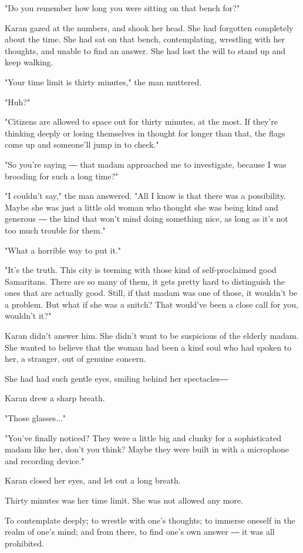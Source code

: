 "Do you remember how long you were sitting on that bench for?"

Karan gazed at the numbers, and shook her head. She had forgotten
completely about the time. She had sat on that bench, contemplating,
wrestling with her thoughts, and unable to find an answer. She had lost
the will to stand up and keep walking.

"Your time limit is thirty minutes," the man muttered.

"Huh?"

"Citizens are allowed to space out for thirty minutes, at the most. If
they're thinking deeply or losing themselves in thought for longer than
that, the flags come up and someone'll jump in to check."

"So you're saying ― that madam approached me to investigate, because I
was brooding for such a long time?"

"I couldn't say," the man answered. "All I know is that there was a
possibility. Maybe she was just a little old woman who thought she was
being kind and generous ― the kind that won't mind doing something nice,
as long as it's not too much trouble for them."

"What a horrible way to put it."

"It's the truth. This city is teeming with those kind of self-proclaimed
good Samaritans. There are so many of them, it gets pretty hard to
distinguish the ones that are actually good. Still, if that madam was
one of those, it wouldn't be a problem. But what if she was a snitch?
That would've been a close call for you, wouldn't it?"

Karan didn't answer him. She didn't want to be suspicious of the elderly
madam. She wanted to believe that the woman had been a kind soul who had
spoken to her, a stranger, out of genuine concern.

She had had such gentle eyes, smiling behind her spectacles―

Karan drew a sharp breath.

"Those glasses..."

"You've finally noticed? They were a little big and clunky for a
sophisticated madam like her, don't you think? Maybe they were built in
with a microphone and recording device."

Karan closed her eyes, and let out a long breath.

Thirty minutes was her time limit. She was not allowed any more.

To contemplate deeply; to wrestle with one's thoughts; to immerse
oneself in the realm of one's mind; and from there, to find one's own
answer ― it was all prohibited.

